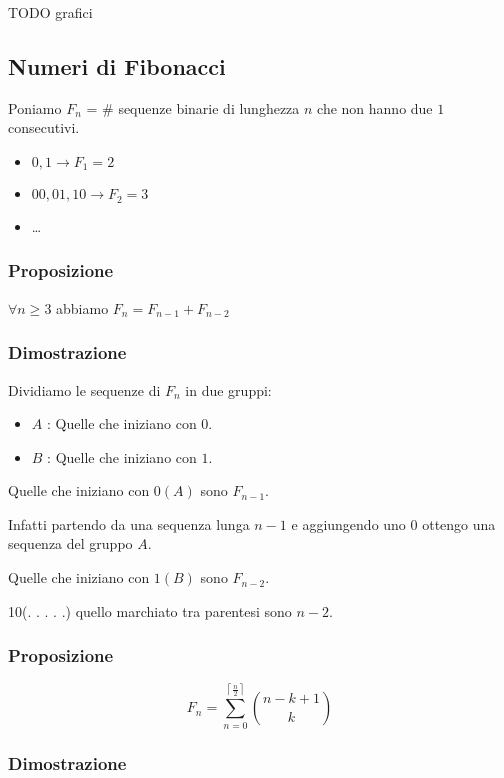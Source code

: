 \documentclass[11pt]{article}
\begin{document}
			TODO grafici

			\subsection{Numeri di Fibonacci}

			Poniamo $F_n$ = \# sequenze binarie di lunghezza $n$ che non hanno
			due $1$ consecutivi.

			\begin{itemize}
				\item $0,1 \to F_1 = 2$
				\item $00, 01, 10 \to  F_2 = 3$
				\item \ldots 
			\end{itemize}

			\subsubsection{Proposizione}

			$\forall n \geq 3$ abbiamo $F_n = F_{n-1} + F_{n-2}$

			\subsubsection{Dimostrazione}

			Dividiamo le sequenze di $F_n$ in due gruppi:
			\begin{itemize}
				\item $A$ : Quelle che iniziano con $0$.
				\item $B$ : Quelle che iniziano con $1$. 
			\end{itemize}
			Quelle che iniziano con $0 (A)$ sono $F_{n-1}$.

			Infatti partendo da una sequenza lunga $n-1$ e aggiungendo uno $0$
			ottengo una sequenza del gruppo $A$.

			Quelle che iniziano con $1 (B)$ sono $F_{n-2}$.

			10(. . . . .) quello marchiato tra parentesi sono $n-2$.
			
			\subsubsection{Proposizione}

			\[
				F_n = \sum_{n=0}^{\left\lceil{\frac{n}{2}}\right\rceil}
				\binom{n-k+1}{k}
			\]

			\subsubsection{Dimostrazione}
\end{document}
